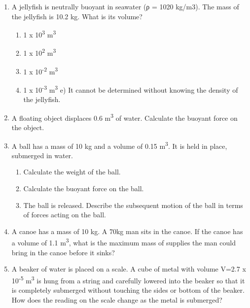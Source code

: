 \documentclass[letterpaper, 11pt]{article}
\begin{document}
\begin{enumerate}
	\item A jellyfish is neutrally buoyant in seawater (ρ = 1020 kg/m3).  The mass of the jellyfish is 10.2 kg.  What is its volume?
	\begin{enumerate}
		\item 1 x 10\textsuperscript{3} m\textsuperscript{3}
		\item 1 x 10\textsuperscript{2} m\textsuperscript{3}
 		\item 1 x 10\textsuperscript{-2} m\textsuperscript{3}
 		\item 1 x 10\textsuperscript{-3} m\textsuperscript{3}
 		e) It cannot be determined without knowing the density of the jellyfish.
	\end{enumerate}
 	\vspace{.15in}
 	\item A floating object displaces 0.6 m\textsuperscript{3} of water. Calculate the buoyant force on the object.
 	\vspace{.95in}
 	
 	\item A ball has a mass of 10 kg and a volume of 0.15 m\textsuperscript{3}.  It is held in place, submerged in water.
	\begin{enumerate}
		\vspace{-.1in}
		\item Calculate the weight of the ball.
		\vspace{.35in}
		\item Calculate the buoyant force on the ball.
		\vspace{.35in}
 		\item The ball is released.  Describe the subsequent motion of the ball in terms of forces acting on the ball.
 		\vspace{.35in}
 		
\end{enumerate}
 
 \item A canoe has a mass of 10 kg.  A 70kg man sits in the canoe.  If the canoe has a volume of 1.1 m\textsuperscript{3}, what is the maximum mass of supplies the man could bring in the canoe before it sinks?
 \vspace{.4in}
 
 \item A beaker of water is placed on a scale.  A cube of metal with volume V=2.7 x 10\textsuperscript{-5} m\textsuperscript{3}  is hung from a string and carefully lowered into the beaker so that it is completely submerged without touching the sides or bottom of the beaker.  How does the reading on the scale change as the metal is submerged? 


\end{enumerate}
\end{document}

